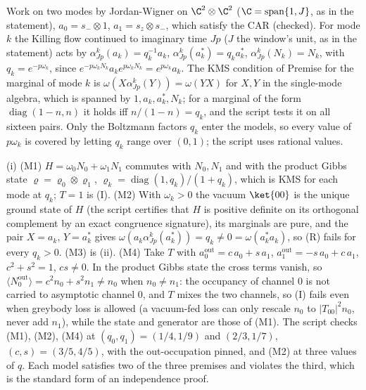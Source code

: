 Work on two modes by Jordan-Wigner on $\C^{2}\otimes\C^{2}$ ($\C = \mathrm{span}\{1, J\}$, as in the statement), $a_{0} = s_{-}\otimes 1$, $a_{1} = s_{z}\otimes s_{-}$, which satisfy the CAR (checked). For mode $k$ the Killing flow continued to imaginary time $Jp$ ($J$ the window's unit, as in the statement) acts by $\alpha^{k}_{Jp}(a_{k}) = q_{k}^{-1}a_{k}$, $\alpha^{k}_{Jp}(a_{k}^{*}) = q_{k}a_{k}^{*}$, $\alpha^{k}_{Jp}(N_{k}) = N_{k}$, with $q_{k} = e^{-p\omega_{k}}$, since $e^{-p\omega_{k}N_{k}}a_{k}e^{p\omega_{k}N_{k}} = e^{p\omega_{k}}a_{k}$. The KMS condition of Premise  for the marginal of mode $k$ is $\omega(X\alpha^{k}_{Jp}(Y)) = \omega(YX)$ for $X, Y$ in the single-mode algebra, which is spanned by $1, a_{k}, a_{k}^{*}, N_{k}$; for a marginal of the form $\operatorname{diag}(1-n, n)$ it holds iff $n/(1-n) = q_{k}$, and the script tests it on all sixteen pairs. Only the Boltzmann factors $q_{k}$ enter the models, so every value of $p\omega_{k}$ is covered by letting $q_{k}$ range over $(0,1)$; the script uses rational values.

(i) (M1) $H = \omega_{0}N_{0} + \omega_{1}N_{1}$ commutes with $N_{0}, N_{1}$ and with the product Gibbs state $\varrho = \varrho_{0}\otimes\varrho_{1}$, $\varrho_{k} = \operatorname{diag}(1, q_{k})/(1 + q_{k})$, which is KMS for each mode at $q_{k}$; $T = 1$ is (I). (M2) With $\omega_{k} > 0$ the vacuum $\ket{00}$ is the unique ground state of $H$ (the script certifies that $H$ is positive definite on its orthogonal complement by an exact congruence signature), its marginals are pure, and the pair $X = a_{k}$, $Y = a_{k}^{*}$ gives $\omega(a_{k}\alpha^{k}_{Jp}(a_{k}^{*})) = q_{k} \ne 0 = \omega(a_{k}^{*}a_{k})$, so (R) fails for every $q_{k} > 0$. (M3) is (ii). (M4) Take $T$ with $a_{0}^{\mathrm{out}} = c\,a_{0} + s\,a_{1}$, $a_{1}^{\mathrm{out}} = -s\,a_{0} + c\,a_{1}$, $c^{2} + s^{2} = 1$, $cs \ne 0$. In the product Gibbs state the cross terms vanish, so $\langle N^{\mathrm{out}}_{0}\rangle = c^{2}n_{0} + s^{2}n_{1} \ne n_{0}$ when $n_{0} \ne n_{1}$: the occupancy of channel 0 is not carried to asymptotic channel 0, and $T$ mixes the two channels, so (I) fails even when greybody loss is allowed (a vacuum-fed loss can only rescale $n_{0}$ to $|T_{00}|^{2}n_{0}$, never add $n_{1}$), while the state and generator are those of (M1). The script checks (M1), (M2), (M4) at $(q_{0}, q_{1}) = (1/4, 1/9)$ and $(2/3, 1/7)$, $(c,s) = (3/5, 4/5)$, with the out-occupation pinned, and (M2) at three values of $q$. Each model satisfies two of the three premises and violates the third, which is the standard form of an independence proof.

